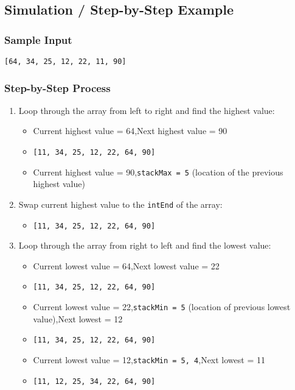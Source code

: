 \documentclass{article}
\begin{document}
\subsection*{Simulation / Step-by-Step Example}
\subsubsection*{Sample Input}
\texttt{[64, 34, 25, 12, 22, 11, 90]}

\subsubsection*{Step-by-Step Process}
\begin{enumerate}
    \item Loop through the array from left to right and find the highest value:
    \begin{itemize}
        \item Current highest value = 64,\quad Next highest value = 90
        \item \texttt{[11, 34, 25, 12, 22, 64, 90]}
        \item Current highest value = 90,\quad \texttt{stackMax = 5} (location of the previous highest value)
    \end{itemize}

    \item Swap current highest value to the \texttt{intEnd} of the array:
    \begin{itemize}
        \item \texttt{[11, 34, 25, 12, 22, 64, 90]}
    \end{itemize}

    \item Loop through the array from right to left and find the lowest value:
    \begin{itemize}
        \item Current lowest value = 64,\quad Next lowest value = 22
        \item \texttt{[11, 34, 25, 12, 22, 64, 90]}
        \item Current lowest value = 22,\quad \texttt{stackMin = 5} (location of previous lowest value),\quad Next lowest = 12
        \item \texttt{[11, 34, 25, 12, 22, 64, 90]}
        \item Current lowest value = 12,\quad \texttt{stackMin = 5, 4},\quad Next lowest = 11
        \item \texttt{[11, 12, 25, 34, 22, 64, 90]}
    \end{itemize}


\end{enumerate}
\end{document}
